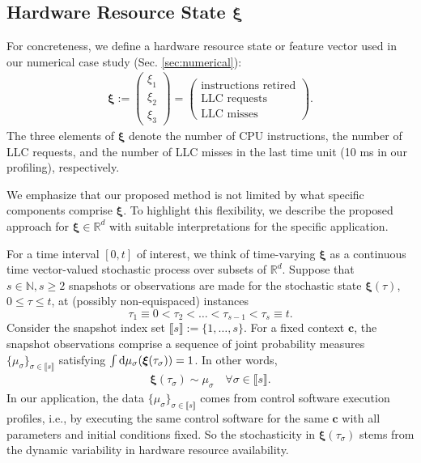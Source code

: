 \documentclass[letterpaper, 10pt, twocolumn]{ieeeconf}      %
\newcommand{\differential}{{\rm{d}}}
\begin{document}
\subsection{Hardware Resource State $\bm{\xi}$}\label{subsec:HardwareResourceStatexi}
\noindent 
For concreteness, we define a hardware resource state or feature vector used in our numerical case study (Sec. \ref{sec:numerical}):
\begin{align}
\bm{\xi}:=\begin{pmatrix}
\xi_1\\
\xi_2\\
\xi_3
\end{pmatrix}=
\begin{pmatrix}
\text{instructions retired}\\
\text{LLC requests}\\
\text{LLC misses}
\end{pmatrix}.
\label{defFeatureVec} 
\end{align}
The three elements of $\bm{\xi}$ denote the number of CPU instructions, the number of LLC requests, and the number of LLC misses in the last time unit (10 ms in our profiling), respectively. 

We emphasize that our proposed method is not limited by what specific components comprise $\bm{\xi}$. To highlight this flexibility, we describe the proposed approach for $\bm{\xi}\in\mathbb{R}^{d}$ with suitable interpretations for the specific application. 

For a time interval $[0,t]$ of interest, we think of time-varying $\bm{\xi}$ as a continuous time vector-valued stochastic process over subsets of $\mathbb{R}^{d}$. Suppose that $s\in\mathbb{N}, s\geq 2$ snapshots or observations are made for the stochastic state $\bm{\xi}(\tau)$, $0\leq \tau\leq t$, at (possibly non-equispaced) instances
$$\tau_{1}\equiv 0 < \tau_2 < \hdots < \tau_{s-1} < \tau_{s}\equiv t.$$ 
Consider the snapshot index set $\llbracket s \rrbracket := \{1,\hdots,s\}$.
For a fixed context $\bm{c}$, the snapshot observations comprise a sequence of joint probability measures $\{\mu_{\sigma}\}_{\sigma\in\llbracket s\rrbracket}$ satisfying $\int\differential\mu_{\sigma}(\bm{\xi}(\tau_{\sigma})) = 1$. In other words, 
\begin{align}
\bm{\xi}(\tau_{\sigma})\sim\mu_{\sigma} \quad \forall\sigma\in\llbracket s\rrbracket.
\label{FeatureDistribution}
\end{align}
In our application, the data $\{\mu_{\sigma}\}_{\sigma\in\llbracket s\rrbracket}$ comes from control software execution profiles, i.e., by executing the same control software for the same $\bm{c}$ with all parameters and initial conditions fixed. So the stochasticity in $\bm{\xi}(\tau_{\sigma})$ stems from the dynamic variability in hardware resource availability.  
\end{document}
